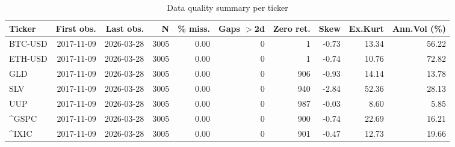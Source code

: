 \begin{table}[H]
\centering
\small
\caption{Data quality summary per ticker}
\label{tab:data_quality}
\begin{tabular}{lrrrrrrrrr}
\toprule
Ticker & First obs. & Last obs. & N & \% miss. & Gaps $>$2d & Zero ret. & Skew & Ex.Kurt & Ann.Vol (\%) \\
\midrule
BTC-USD & 2017-11-09 & 2026-03-28 & 3005 & 0.00 & 0 & 1 & -0.73 & 13.34 & 56.22 \\
ETH-USD & 2017-11-09 & 2026-03-28 & 3005 & 0.00 & 0 & 1 & -0.74 & 10.76 & 72.82 \\
GLD & 2017-11-09 & 2026-03-28 & 3005 & 0.00 & 0 & 906 & -0.93 & 14.14 & 13.78 \\
SLV & 2017-11-09 & 2026-03-28 & 3005 & 0.00 & 0 & 940 & -2.84 & 52.36 & 28.13 \\
UUP & 2017-11-09 & 2026-03-28 & 3005 & 0.00 & 0 & 987 & -0.03 & 8.60 & 5.85 \\
^GSPC & 2017-11-09 & 2026-03-28 & 3005 & 0.00 & 0 & 900 & -0.74 & 22.69 & 16.21 \\
^IXIC & 2017-11-09 & 2026-03-28 & 3005 & 0.00 & 0 & 901 & -0.47 & 12.73 & 19.66 \\
\bottomrule
\end{tabular}
\end{table}